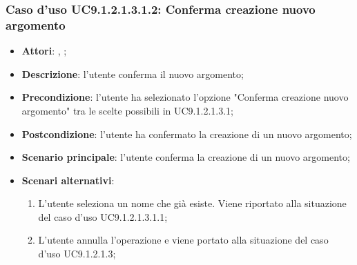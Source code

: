 							\subsubsection{Caso d'uso UC9.1.2.1.3.1.2: Conferma creazione nuovo argomento}
							\label{UC9.1.2.1.3.1.2}
							\begin{itemize}
								\item \textbf{Attori}: \uau, \uaupro;
								\item \textbf{Descrizione}: l'utente conferma il nuovo argomento;
								\item \textbf{Precondizione}: l'utente ha selezionato l'opzione "Conferma creazione nuovo argomento" tra le scelte possibili in UC9.1.2.1.3.1;
								\item \textbf{Postcondizione}: l'utente ha confermato la creazione di un nuovo argomento;
								\item \textbf{Scenario principale}: l'utente conferma la creazione di un nuovo argomento;
								\item \textbf{Scenari alternativi}: 
									\begin{enumerate}
										\item L'utente seleziona un nome che già esiste. Viene riportato alla situazione del caso d'uso UC9.1.2.1.3.1.1;
										\item L'utente annulla l'operazione e viene portato alla situazione del caso d'uso UC9.1.2.1.3;
									\end{enumerate}
						
							\end{itemize}
						
